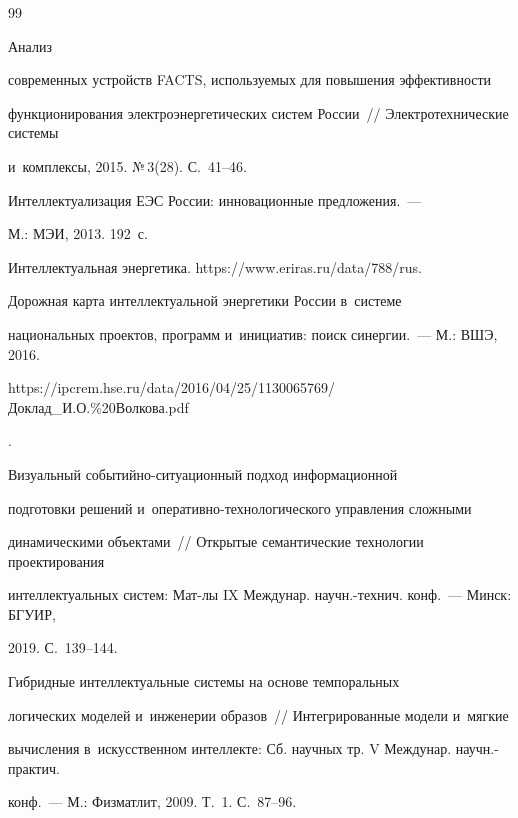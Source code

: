 {{\begin{thebibliography}{99}


   Анализ 


современных устройств FACTS, используемых для повышения эффективности 


функционирования электроэнергетических систем России~/\!\!/ Электротехнические системы 


и~комплексы, 2015. №\,3(28). С.~41--46.




   Интеллектуализация ЕЭС России: инновационные предложения.~--- 


  М.: МЭИ, 2013. 192~с.




  Интеллектуальная энергетика. {\sf https://www.eriras.ru/data/788/rus}.




 Дорожная карта интеллектуальной энергетики России в~системе 


национальных проектов, программ и~инициатив: поиск синергии.~--- М.: ВШЭ, 2016. {\sf 


https://ipcrem.hse.ru/data/2016/04/25/1130065769/Доклад\_И.О.\%20Волкова.\linebreak pdf}.




   Визуальный событийно-ситуационный подход информационной 


подготовки решений и~опе\-ра\-тив\-но-тех\-но\-ло\-ги\-че\-ско\-го управ\-ле\-ния сложными 


динамическими объектами~/\!\!/ Открытые семантические технологии проектирования 


интеллектуальных систем: Мат-лы IX Междунар. научн.-технич. конф.~--- Минск: БГУИР, 


2019. С.~139--144.




   Гибридные интеллектуальные системы на основе темпоральных 


логических моделей и~инженерии образов~/\!\!/ Интегрированные модели и~мягкие 


вычисления в~искусственном интеллекте: Сб. научных тр. V Междунар. научн.-практич. 


конф.~--- М.: Физматлит, 2009. Т.~1. С.~87--96. 





\end{thebibliography}}}
